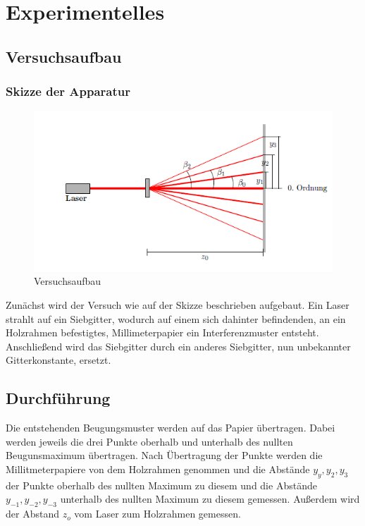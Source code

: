 \documentclass[12pt,a4paper,titlepage,headinclude,bibtotoc]{scrartcl}
\begin{document}
\section{Experimentelles}

\subsection{Versuchsaufbau}

\subsubsection{Skizze der Apparatur}
\begin{figure} [h]
\begin{center}
\includegraphics[scale=1]{Versuchsaufbau.png} \end{center}
\caption{Versuchsaufbau}
\end{figure}

Zunächst wird der Versuch wie auf der Skizze beschrieben aufgebaut.
Ein Laser strahlt auf ein Siebgitter, wodurch auf einem sich dahinter befindenden, an ein Holzrahmen befestigtes, Millimeterpapier ein Interferenzmuster entsteht. Anschließend wird das Siebgitter durch ein anderes Siebgitter, nun unbekannter Gitterkonstante, ersetzt.


\subsection{Durchführung}
Die entstehenden Beugungsmuster werden auf das Papier übertragen. Dabei werden jeweils die drei Punkte  oberhalb und unterhalb des nullten Beugunsmaximum übertragen.
Nach Übertragung der Punkte werden die Millitmeterpapiere von dem Holzrahmen genommen und die Abstände $y_{y},y_{2},y_{3}$ der Punkte oberhalb des nullten Maximum zu diesem und die Abstände $y_{-1},y_{-2},y_{-3}$ unterhalb des nullten Maximum zu diesem gemessen. Außerdem wird der Abstand $z_{o}$ vom Laser zum Holzrahmen gemessen.
\end{document}
